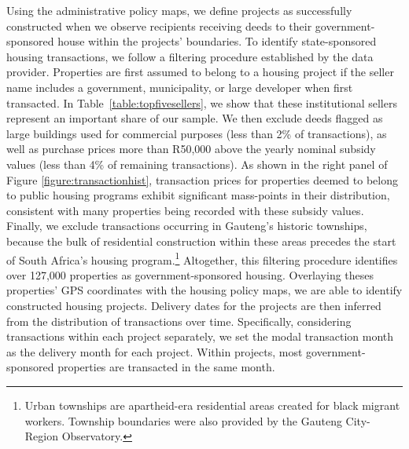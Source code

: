 \documentclass[12pt]{article}
\begin{document}
 Using the administrative policy maps, we define projects as successfully constructed when we observe recipients receiving deeds to their government-sponsored house within the projects' boundaries. To identify state-sponsored housing transactions, we follow a filtering procedure established by the data provider. Properties are first assumed to belong to a housing project if the seller name includes a government, municipality, or large developer when first transacted. In 	\mbox{Table \ref{table:topfivesellers}}, we show that these institutional sellers represent an important share of our sample. We then exclude deeds flagged as large buildings used for commercial purposes (less than 2\% of transactions), as well as purchase prices more than R50,000 above the yearly nominal subsidy values (less than 4\% of remaining transactions). As shown in the right panel of Figure \ref{figure:transactionhist}, transaction prices for properties deemed to belong to public housing programs exhibit significant mass-points in their distribution, consistent with many properties being recorded with these subsidy values. Finally, we exclude transactions occurring in Gauteng's historic townships, because the bulk of residential construction within these areas precedes the start of South Africa's housing program.\footnote{Urban townships are apartheid-era residential areas created for black migrant workers. Township boundaries were also provided by the Gauteng City-Region Observatory.} Altogether, this filtering procedure identifies over 127,000 properties as government-sponsored housing. Overlaying theses properties' GPS coordinates with the housing policy maps, we are able to identify constructed housing projects. Delivery dates for the projects are then inferred from the distribution of transactions over time. Specifically, considering transactions within each project separately, we set the modal transaction month as the delivery month for each project. Within projects, most government-sponsored properties are transacted in the same month. %
\end{document}
